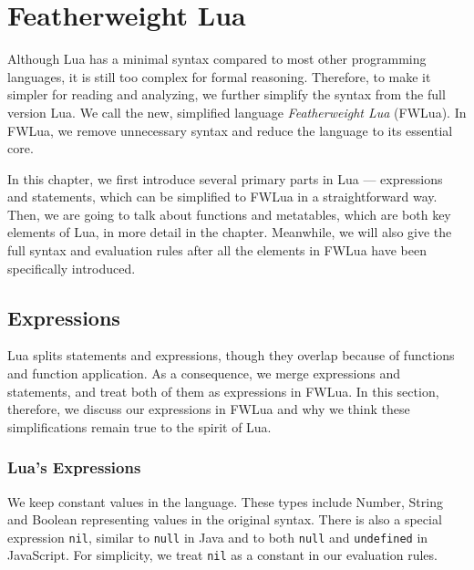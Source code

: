 \chapter{Featherweight Lua}
Although Lua has a minimal syntax compared to most other programming languages, it is still too complex for formal reasoning. Therefore, to make it simpler for reading and analyzing, we further simplify the syntax from the full version Lua. We call the new, simplified language {\it Featherweight Lua} (FWLua). In FWLua, we remove unnecessary syntax and reduce the language to its essential core.

In this chapter, we first introduce several primary parts in Lua --- expressions and statements, which can be simplified to FWLua in a straightforward way. Then, we are going to talk about functions and metatables, which are both key elements of Lua, in more detail in the chapter. Meanwhile, we will also give the full syntax and evaluation rules after all the elements in FWLua have been specifically introduced.

\section{Expressions}
Lua splits statements and expressions, though they overlap because of functions and function application. As a consequence, we merge expressions and statements, and treat both of them as expressions in FWLua. In this section, therefore, we discuss our expressions in FWLua and why we think these simplifications remain true to the spirit of Lua. 

\subsection{Lua's Expressions}

We keep constant values in the language.
These types include Number, String and Boolean representing values in the original syntax.
%
There is also a special expression {\tt nil}, similar to {\tt null} in Java and to both {\tt null} and {\tt undefined} in JavaScript.
For simplicity, we treat {\tt nil} as a constant in our evaluation rules.

